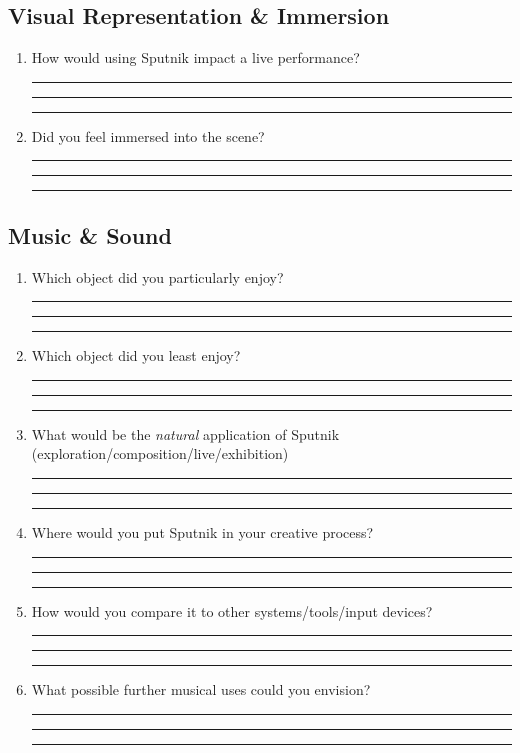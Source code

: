 \documentclass[10pt,a4paper]{scrartcl}
\begin{document}
\subsection{Visual Representation \& Immersion}
\begin{enumerate}

\item How would using Sputnik impact a live performance?\\
\rule{\linewidth}{0.25pt}
\rule{\linewidth}{0.25pt}
\rule{\linewidth}{0.25pt}

\item Did you feel immersed into the scene?\\
\rule{\linewidth}{0.25pt}
\rule{\linewidth}{0.25pt}
\rule{\linewidth}{0.25pt}

\end{enumerate}

\subsection{Music \& Sound}
\begin{enumerate}

\item Which object did you particularly enjoy?\\
\rule{\linewidth}{0.25pt}
\rule{\linewidth}{0.25pt}
\rule{\linewidth}{0.25pt}

\item Which object did you least enjoy?\\
\rule{\linewidth}{0.25pt}
\rule{\linewidth}{0.25pt}
\rule{\linewidth}{0.25pt}

\item What would be the \emph{natural} application of Sputnik (exploration/composition/live/exhibition)\\
\rule{\linewidth}{0.25pt}
\rule{\linewidth}{0.25pt}
\rule{\linewidth}{0.25pt}

\item Where would you put Sputnik in your creative process?\\
\rule{\linewidth}{0.25pt}
\rule{\linewidth}{0.25pt}
\rule{\linewidth}{0.25pt}

\item How would you compare it to other systems/tools/input devices?\\
\rule{\linewidth}{0.25pt}
\rule{\linewidth}{0.25pt}
\rule{\linewidth}{0.25pt}

\item What possible further musical uses could you envision?\\
\rule{\linewidth}{0.25pt}
\rule{\linewidth}{0.25pt}
\rule{\linewidth}{0.25pt}





\end{enumerate}
\end{document}
